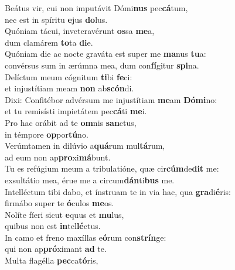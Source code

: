 \evenverse Beátus vir, cui non imputávit Dómi\textbf{nus} pec\textbf{cá}tum,~\*\\
\evenverse nec est in spíritu \textbf{e}jus \textbf{do}lus.\\
\oddverse Quóniam tácui, inveteravérunt \textbf{os}sa \textbf{me}a,~\*\\
\oddverse dum clamárem \textbf{to}ta \textbf{di}e.\\
\evenverse Quóniam die ac nocte graváta est super me \textbf{ma}nus \textbf{tu}a:~\*\\
\evenverse convérsus sum in ærúmna mea, dum con\textbf{fí}gitur \textbf{spi}na.\\
\oddverse Delíctum meum cógnitum \textbf{ti}bi \textbf{fe}ci:~\*\\
\oddverse et injustítiam meam \textbf{non} ab\textbf{scón}di.\\
\evenverse Dixi: Confitébor advérsum me injustítiam \textbf{me}am \textbf{Dó}\textbf{mi}no:~\*\\
\evenverse et tu remisísti impietátem pec\textbf{cá}ti \textbf{me}i.\\
\oddverse Pro hac orábit ad te \textbf{om}nis \textbf{san}ctus,~\*\\
\oddverse in témpore \textbf{op}por\textbf{tú}no.\\
\evenverse Verúmtamen in dilúvio a\textbf{quá}rum mul\textbf{tá}rum,~\*\\
\evenverse ad eum non ap\textbf{pro}xi\textbf{má}bunt.\\
\oddverse Tu es refúgium meum a tribulatióne, quæ cir\textbf{cúm}de\textbf{dit} me:~\*\\
\oddverse exsultátio mea, érue me a circum\textbf{dán}ti\textbf{bus} me.\\
\evenverse Intelléctum tibi dabo, et ínstruam te in via hac, qua \textbf{gra}di\textbf{é}ris:~\*\\
\evenverse firmábo super te \textbf{ó}culos \textbf{me}os.\\
\oddverse Nolíte fíeri sicut \textbf{e}quus et \textbf{mu}lus,~\*\\
\oddverse quibus non est \textbf{in}tel\textbf{lé}ctus.\\
\evenverse In camo et freno maxíllas e\textbf{ó}rum con\textbf{strín}ge:~\*\\
\evenverse qui non ap\textbf{pró}ximant \textbf{ad} te.\\
\oddverse Multa flagélla \textbf{pec}ca\textbf{tó}ris,~\*\\
